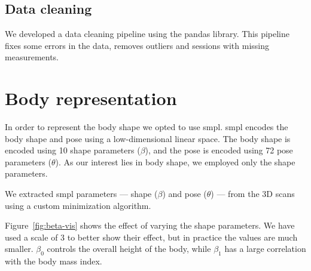 \subsection{Data cleaning}

We developed a data cleaning pipeline using the \gls{pandas} library. This
pipeline fixes some errors in the data, removes outliers and sessions with
missing measurements.

\section{Body representation}

In order to represent the body shape we opted to use \gls{smpl}. \gls{smpl}
encodes the body shape and pose using a low-dimensional linear space. The body
shape is encoded using 10 shape parameters ($\beta$), and the pose is encoded
using 72 pose parameters ($\theta$). As our interest lies in body shape, we
employed only the shape parameters.

We extracted \gls{smpl} parameters --- shape ($\beta$) and pose ($\theta$) ---
from the 3D scans using a custom minimization algorithm.



Figure~\ref{fig:beta-vis} shows the effect of varying the shape parameters. We
have used a scale of 3 to better show their effect, but in practice the values
are much smaller. $\beta_0$ controls the overall height of the body, while
$\beta_1$ has a large correlation with the body mass index.


